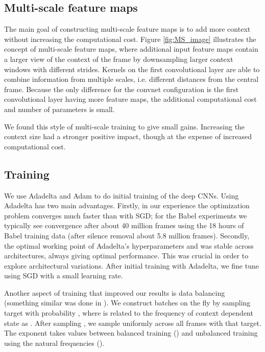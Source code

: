 \documentclass{article}
\begin{document}
\subsection{Multi-scale feature maps}
The main goal of constructing multi-scale feature maps is to add more context 
without increasing the computational cost.
Figure \ref{fig:MS_image} illustrates the concept of multi-scale feature maps,
where additional input feature maps contain a larger view of the context of the frame
by downsampling larger context windows with different strides.
Kernels on the first convolutional layer are able to combine information from
multiple scales, i.e. different distances from the central frame.
Because the only difference for the convnet configuration is the first convolutional
layer having more feature maps, the additional computational cost
and number of parameters is small.

We found this style of multi-scale training to give small gains. 
Increasing the context size had a stronger positive impact, though
at the expense of increased computational cost.

\subsection{Training}
\label{ssec:training}


We use Adadelta \cite{zeiler2012adadelta} and Adam \cite{kingma2014adam} to do initial training
of the deep CNNs. Using Adadelta has two main advantages. Firstly, in our experience the optimization
problem converges much faster than with SGD; for the Babel experiments
we typically see convergence after about 40 million frames
using the 18 hours of Babel training data (after silence removal about 5.8 million frames).
Secondly, the optimal working point of Adadelta's hyperparameters  and  
was stable across architectures, always giving optimal performance. This was crucial in order to 
explore architectural variations.
After initial training with Adadelta, we fine tune using SGD with a small learning rate.

Another aspect of training that improved our results is data balancing (something similar 
was done in \cite{sermanet2013overfeat}). We construct batches on the fly
by sampling target  with probability , where  is related to the frequency  of
context dependent state  as .
After sampling , we sample uniformly across all frames with that target.
The exponent  takes values between balanced training () and
unbalanced training using the natural frequencies ().
\end{document}
